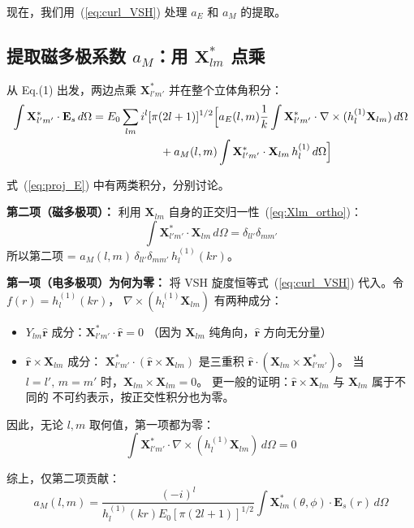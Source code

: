 现在，我们用~(\ref{eq:curl_VSH}) 处理 $a_E$ 和 $a_M$ 的提取。

\subsection{提取磁多极系数 $a_M$：用 $\mathbf{X}_{lm}^*$ 点乘}

从 Eq.(1) 出发，两边点乘 $\mathbf{X}_{l'm'}^*$ 并在整个立体角积分：
\begin{align}
\int \mathbf{X}_{l'm'}^*\cdot\mathbf{E}_s\,d\Omega
&= E_0\sum_{lm} i^l[\pi(2l+1)]^{1/2} \Bigl[
    a_E(l,m)\frac{1}{k}\int \mathbf{X}_{l'm'}^*\cdot\nabla\times(h_l^{(1)}\mathbf{X}_{lm})\,d\Omega \notag\\
&\qquad\qquad\qquad + a_M(l,m)\int \mathbf{X}_{l'm'}^*\cdot\mathbf{X}_{lm}\,h_l^{(1)}\,d\Omega \Bigr]
\label{eq:proj_E}
\end{align}

式~(\ref{eq:proj_E}) 中有两类积分，分别讨论。

\textbf{第二项（磁多极项）：}
利用 $\mathbf{X}_{lm}$ 自身的正交归一性~(\ref{eq:Xlm_ortho})：
$$
\int \mathbf{X}_{l'm'}^*\cdot\mathbf{X}_{lm}\,d\Omega = \delta_{ll'}\delta_{mm'}
$$
所以第二项 = $a_M(l,m)\,\delta_{ll'}\delta_{mm'}\,h_l^{(1)}(kr)$。

\textbf{第一项（电多极项）为何为零：}
将 VSH 旋度恒等式~(\ref{eq:curl_VSH}) 代入。令 $f(r)=h_l^{(1)}(kr)$，
$\nabla\times(h_l^{(1)}\mathbf{X}_{lm})$ 有两种成分：
\begin{itemize}
  \item $Y_{lm}\hat{\mathbf{r}}$ 成分：$\mathbf{X}_{l'm'}^*\cdot\hat{\mathbf{r}} = 0$
    （因为 $\mathbf{X}_{lm}$ 纯角向，$\hat{\mathbf{r}}$ 方向无分量）
  \item $\hat{\mathbf{r}}\times\mathbf{X}_{lm}$ 成分：
    $\mathbf{X}_{l'm'}^*\cdot(\hat{\mathbf{r}}\times\mathbf{X}_{lm})$ 是三重积
    $\hat{\mathbf{r}}\cdot(\mathbf{X}_{lm}\times\mathbf{X}_{l'm'}^*)$。
    当 $l=l',\,m=m'$ 时，$\mathbf{X}_{lm}\times\mathbf{X}_{lm}=0$。
    更一般的证明：$\hat{\mathbf{r}}\times\mathbf{X}_{lm}$ 与 $\mathbf{X}_{lm}$ 属于不同的
    不可约表示，按正交性积分也为零。
\end{itemize}
因此，无论 $l,m$ 取何值，第一项都为零：
$$
\int \mathbf{X}_{l'm'}^*\cdot\nabla\times(h_l^{(1)}\mathbf{X}_{lm})\,d\Omega = 0
$$

综上，仅第二项贡献：
\begin{equation}
  \boxed{\;
    a_M(l,m) = \frac{(-i)^{l}}{h_l^{(1)}(kr)E_0[\pi(2l+1)]^{1/2}}
    \int \mathbf{X}_{lm}^*(\theta,\phi)\cdot\mathbf{E}_s(r)\,d\Omega
    \;}
  \label{eq:aM_proj}
\end{equation}

